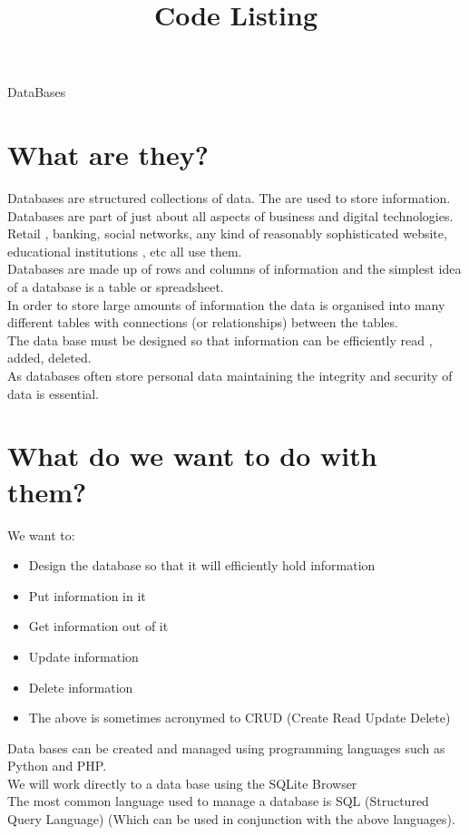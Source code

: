 \documentclass[a4paper,12pt]{article}
\title{Code Listing}
\date{ }
\begin{document}
	DataBases
	\tableofcontents
	\newpage
	\section{What are they?}
	Databases are structured collections of data. The are used to store information. \\
	Databases are part of just about all aspects of business and digital technologies.\\
	Retail , banking,  social networks, any kind of reasonably sophisticated website, educational institutions , etc  all use them.\\
	Databases are made up of rows and columns of information and the simplest idea of a database is a table or spreadsheet.\\
	In order to store large amounts of information the data is organised into many different tables with connections (or relationships) between the tables.\\
	The data base must be designed so that information can be efficiently read , added, deleted.\\
	As databases often store personal data maintaining the integrity and security of data is essential.\\
	
	\section{What do we want to do with them?}
	We want to:
	\begin{itemize}
		\item Design the database so that it will efficiently hold information
		\item Put information in it
		\item Get information out of it
		\item Update information
		\item Delete information
		\item The above is sometimes acronymed to CRUD (Create Read Update Delete)
	\end{itemize}
Data bases can be created and managed using programming languages such as Python and PHP.\\
We will work directly to a data base using the SQLite Browser \\
The most common language used to manage a database is SQL (Structured Query Language)  (Which can be used in conjunction with the above languages).
\end{document}

